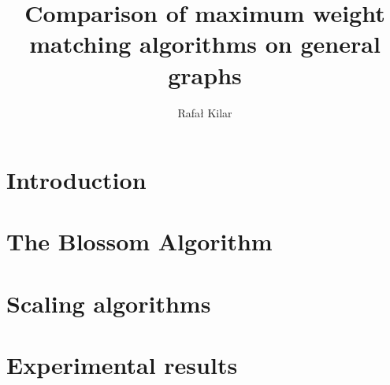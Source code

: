 \documentclass{report}
\title{Comparison of maximum weight matching algorithms on general graphs}
\author{Rafał Kilar}
\begin{document}

\pagebreak


\tableofcontents
\pagebreak

\chapter{Introduction}




\chapter{The Blossom Algorithm}\label{chap:blossom}


\chapter{Scaling algorithms}\label{chap:scaling}


\chapter{Experimental results}\label{chap:results}


\printbibliography
\end{document}
